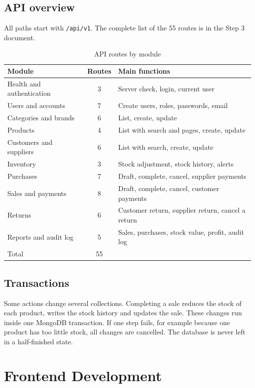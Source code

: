 \documentclass[11pt,a4paper]{article}
\newcommand{\code}[1]{\texttt{#1}}
\begin{document}
\subsection{API overview}
All paths start with \code{/api/v1}. The complete list of the 55 routes is in the Step 3 document.
\begin{table}[H]
\centering
\begin{tabularx}{\textwidth}{@{}P{4.4cm}cY@{}}
\toprule
\textbf{Module} & \textbf{Routes} & \textbf{Main functions} \\
\midrule
Health and authentication & 3 & Server check, login, current user \\
Users and accounts & 7 & Create users, roles, passwords, email \\
Categories and brands & 6 & List, create, update \\
Products & 4 & List with search and pages, create, update \\
Customers and suppliers & 6 & List with search, create, update \\
Inventory & 3 & Stock adjustment, stock history, alerts \\
Purchases & 7 & Draft, complete, cancel, supplier payments \\
Sales and payments & 8 & Draft, complete, cancel, customer payments \\
Returns & 6 & Customer return, supplier return, cancel a return \\
Reports and audit log & 5 & Sales, purchases, stock value, profit, audit log \\
\midrule
Total & 55 & \\
\bottomrule
\end{tabularx}
\caption{API routes by module}
\end{table}

\subsection{Transactions}
Some actions change several collections. Completing a sale reduces the stock of each product, writes the stock history and updates the sale. These changes run inside one MongoDB transaction. If one step fails, for example because one product has too little stock, all changes are cancelled. The database is never left in a half-finished state.

\section{Frontend Development}
\end{document}
